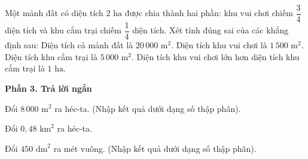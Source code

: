\begin{ex} %
Một mảnh đất có diện tích $2\text{ ha}$ được chia thành hai phần: khu vui chơi chiếm $\dfrac{3}{4}$ diện tích và khu cắm trại chiếm $\dfrac{1}{4}$ diện tích. Xét tính đúng sai của các khẳng định sau:
\choiceTF
{\True Diện tích cả mảnh đất là $20\,000\text{ m}^2$.}
{Diện tích khu vui chơi là $1\,500\text{ m}^2$.}
{\True Diện tích khu cắm trại là $5\,000\text{ m}^2$.}
{\True Diện tích khu vui chơi lớn hơn diện tích khu cắm trại là $1\text{ ha}$.}
\end{ex}

\textbf{Phần 3. Trả lời ngắn}

\begin{ex} %
Đổi $8\,000\text{ m}^2$ ra héc-ta. (Nhập kết quả dưới dạng số thập phân).
\end{ex}

\begin{ex} %
Đổi $0{,}48\text{ km}^2$ ra héc-ta.
\end{ex}

\begin{ex} %
Đổi $450\text{ dm}^2$ ra mét vuông. (Nhập kết quả dưới dạng số thập phân).
\end{ex}

